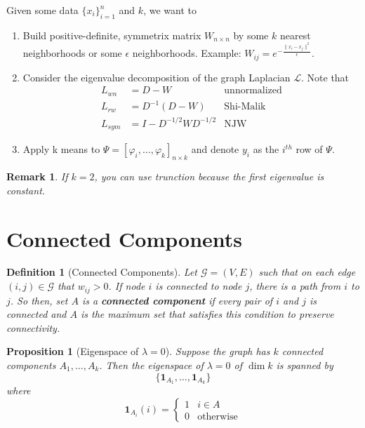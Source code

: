 \documentclass[12pt]{article}
\theoremstyle{plain}
\newtheorem*{definition}{Definition}
\newtheorem*{remark}{Remark}
\newtheorem*{proposition}{Proposition}
\begin{document}
Given some data $ \{ x_i \}_{i = 1}^n $ and $ k $, we want to
\begin{enumerate}
  \item Build positive-definite, symmetrix matrix $ W_{n \times n} $ by some $ k $ nearest neighborhoods or some $ \epsilon $ neighborhoods.
  Example: $ W_{ij} = e^{- \frac{\| x_i - x_j \|^2}{\epsilon}} $.
  \item Consider the eigenvalue decomposition of the graph Laplacian $ \mathcal{L} $.
  Note that
  \begin{align*}
    L_{wn} &= D - W  & \text{unnormalized} \\
    L_{rw} &= D^{-1} (D - W) & \text{Shi-Malik} \\
    L_{sym} &= I - D^{-1/2} W D^{-1/2} & \text{NJW}
  \end{align*}
  \item Apply k means to $ \Psi = [\varphi_i, \ldots, \varphi_k]_{n \times k} $ and denote $ y_i $ as the $ i^{th} $ row of $ \Psi $.
\end{enumerate}

\begin{remark}
  If $ k = 2$, you can use trunction because the first eigenvalue is constant.
\end{remark}

\section{Connected Components}
\label{sec:connected}

\begin{definition}[Connected Components]

Let $ \mathcal{G} = (V, E) $ such that on each edge $ (i, j) \in \mathcal{G} $ that $ w_{ij} > 0 $.
If node $ i $ is connected to node $ j $, there is a path from $ i $ to $ j $.
So then, set $ A $ is a \textbf{connected component} if every pair of $ i $ and $ j $ is connected and $ A $ is the maximum set that satisfies this condition to preserve connectivity.

\end{definition}

\begin{proposition}[Eigenspace of $ \lambda = 0 $]

Suppose the graph has $ k $ connected components $ A_{1}, \ldots, A_{k} $.
Then the eigenspace of $ \lambda = 0 $ of $ \dim{k} $ is spanned by
\[
\{ \mathbf{1}_{A_{1}}, \ldots, \mathbf{1}_{A_{k}} \}
\]
where
\[
\mathbf{1}_{A_{i}} (i) =
\begin{cases}
  1 & i \in A \\
  0 & \text{otherwise}
\end{cases}
\]

\end{proposition}
\end{document}
